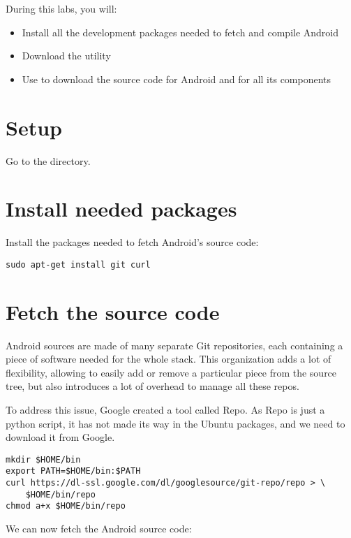 
During this labs, you will:
\begin{itemize}
  \item Install all the development packages needed to fetch and compile Android
  \item Download the  utility
  \item Use  to download the source code for Android
        and for all its components 
\end{itemize}

\section{Setup}

Go to the  directory.

\section{Install needed packages}

Install the packages needed to fetch Android's source code:

\begin{verbatim}
sudo apt-get install git curl
\end{verbatim}

\section{Fetch the source code}

Android sources are made of many separate Git repositories, each
containing a piece of software needed for the whole stack. This
organization adds a lot of flexibility, allowing to easily add or
remove a particular piece from the source tree, but also introduces a
lot of overhead to manage all these repos.

To address this issue, Google created a tool called Repo. As Repo is
just a python script, it has not made its way in the Ubuntu packages,
and we need to download it from Google.

\begin{verbatim}
mkdir $HOME/bin
export PATH=$HOME/bin:$PATH
curl https://dl-ssl.google.com/dl/googlesource/git-repo/repo > \
    $HOME/bin/repo
chmod a+x $HOME/bin/repo
\end{verbatim}

We can now fetch the Android source code:

